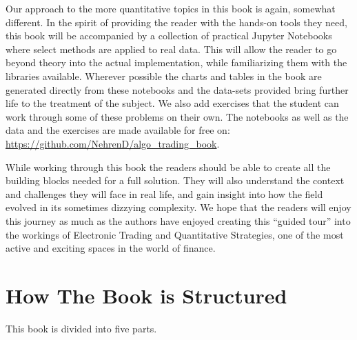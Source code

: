 Our approach to the more quantitative topics in this book is again, somewhat different. In the spirit of providing the reader with the hands-on tools they need, this book will be accompanied by a collection of practical Jupyter Notebooks where select methods are applied to real data. This will allow the reader to go beyond theory into the actual implementation, while familiarizing them with the libraries available. Wherever possible the charts and tables in the book are generated directly from these notebooks and the data-sets provided bring further life to the treatment of the subject. We also add  exercises that the student can work through some of these problems on their own. The notebooks as well as the data and the exercises are made  available for free on: \url{https://github.com/NehrenD/algo_trading_book}.


While working through this book the readers should be able to create all the building blocks needed for a full solution. They will also understand the context and challenges they will face in real life, and gain insight into how the field evolved in its sometimes dizzying complexity. We hope that the readers will enjoy this journey as much as the authors have enjoyed creating this ``guided tour'' into the workings of Electronic Trading and Quantitative Strategies, one of the most active and exciting spaces in the world of finance.

\section{How The Book is Structured}

This book is divided into five parts. 

